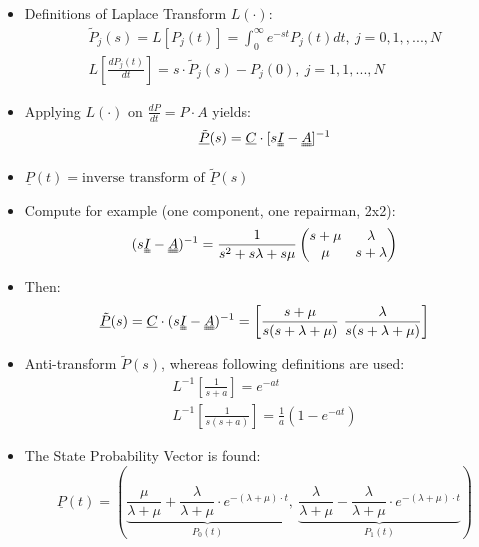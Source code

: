 \documentclass[8pt, landscape, fleqn]{scrartcl}
\begin{document}
\begin{multicols*}{3}
\begin{itemize}
    \item Definitions of Laplace Transform $L(\cdot)$:
    \begin{align}
        \tilde{P}_j(s) = L[P_{j}(t)] = \int_0^\infty e^{-st} P_j(t) dt, ~ j=0,1,,...,N \\
        L\left[\frac{dP_j(t)}{dt}\right] = s\cdot\tilde{P}_j(s) - P_j(0),~ j=1,1,...,N
    \end{align}
    \item Applying $L(\cdot)$ on $\frac{dP}{dt} = P\cdot A$ yields:
    \begin{equation}
        \underline{\tilde{P}}(s) = \underline{C}\cdot [s\uuline{I}-\uuline{A}]^{-1}
    \end{equation}
    \item $\underline{P}(t) = \text{inverse transform of } \underline{\tilde{P}}(s)$
    \item Compute for example (one component, one repairman, 2x2):
    \begin{equation}
        (s\uuline{I}-\uuline{A})^{-1} = \frac{1}{s^2 + s\lambda + s \mu}\begin{pmatrix}
            s+\mu & \lambda \\
            \mu & s+\lambda
        \end{pmatrix}
    \end{equation}
    \item Then:
    \begin{equation}
        \underline{\tilde{P}}(s) = \underline{C}\cdot(s\uuline{I}-\uuline{A})^{-1} = \left[\frac{s+\mu}{s(s+\lambda+\mu)}~ \frac{\lambda}{s(s+\lambda+\mu)}\right]
    \end{equation}
    \item Anti-transform $\tilde{P}(s)$, whereas following definitions are used:
    \begin{align}
        L^{-1}\left[\frac{1}{s+a}\right] = e^{-at} \\
        L^{-1}\left[\frac{1}{s(s+a)}\right] = \frac{1}{a}\left(1-e^{-at}\right)
    \end{align}
    \item The State Probability Vector is found:
    \begin{equation}
            \underline{P}(t) = \left(\underbrace{\frac{\mu}{\lambda+\mu}+\frac{\lambda}{\lambda+\mu}\cdot e^{-\left(\lambda+\mu \right) \cdot t}}_{P_0(t)} , ~ \underbrace{\frac{\lambda}{\lambda+\mu} - \frac{\lambda}{\lambda+\mu} \cdot e^{-\left(\lambda+\mu \right)\cdot t}}_{P_1(t)}\right)

\end{equation}
\end{itemize}
\end{multicols*}
\end{document}
